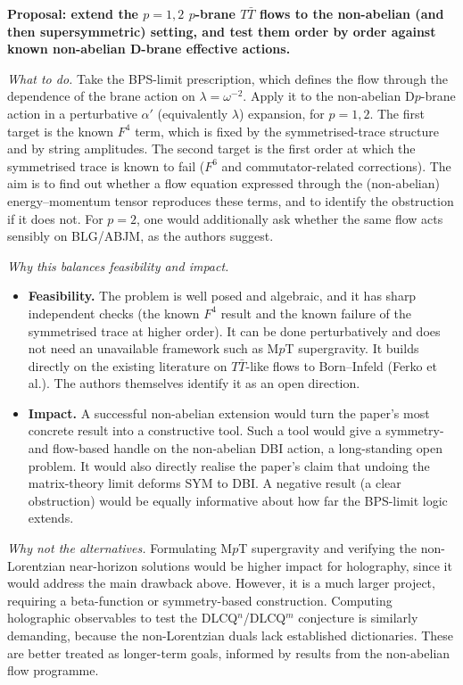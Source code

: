 \documentclass[11pt]{article}
\newcommand{\TTbar}{T\bar{T}}
\begin{document}
\textbf{Proposal: extend the $p=1,2$ $p$-brane $\TTbar$ flows to the non-abelian (and then supersymmetric) setting, and test them order by order against known non-abelian D-brane effective actions.}

\emph{What to do.}
Take the BPS-limit prescription, which defines the flow through the dependence of the brane action on $\lambda=\omega^{-2}$. Apply it to the non-abelian D$p$-brane action in a perturbative $\alpha'$ (equivalently $\lambda$) expansion, for $p=1,2$. The first target is the known $F^4$ term, which is fixed by the symmetrised-trace structure and by string amplitudes. The second target is the first order at which the symmetrised trace is known to fail ($F^6$ and commutator-related corrections). The aim is to find out whether a flow equation expressed through the (non-abelian) energy--momentum tensor reproduces these terms, and to identify the obstruction if it does not.
For $p=2$, one would additionally ask whether the same flow acts sensibly on BLG/ABJM, as the authors suggest.

\emph{Why this balances feasibility and impact.}
\begin{itemize}
\item \textbf{Feasibility.} The problem is well posed and algebraic, and it has sharp independent checks (the known $F^4$ result and the known failure of the symmetrised trace at higher order). It can be done perturbatively and does not need an unavailable framework such as M$p$T supergravity. It builds directly on the existing literature on $\TTbar$-like flows to Born--Infeld (Ferko et al.). The authors themselves identify it as an open direction.
\item \textbf{Impact.} A successful non-abelian extension would turn the paper's most concrete result into a constructive tool. Such a tool would give a symmetry- and flow-based handle on the non-abelian DBI action, a long-standing open problem. It would also directly realise the paper's claim that undoing the matrix-theory limit deforms SYM to DBI. A negative result (a clear obstruction) would be equally informative about how far the BPS-limit logic extends.
\end{itemize}

\emph{Why not the alternatives.}
Formulating M$p$T supergravity and verifying the non-Lorentzian near-horizon solutions would be higher impact for holography, since it would address the main drawback above. However, it is a much larger project, requiring a beta-function or symmetry-based construction. Computing holographic observables to test the DLCQ$^n$/DLCQ$^m$ conjecture is similarly demanding, because the non-Lorentzian duals lack established dictionaries. These are better treated as longer-term goals, informed by results from the non-abelian flow programme.
\end{document}
